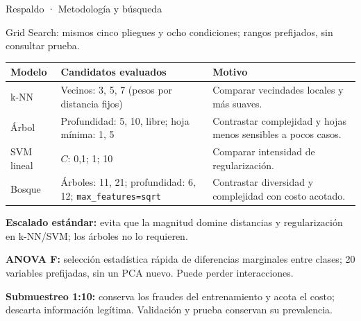\documentclass[aspectratio=169,10pt]{beamer}
\begin{document}
\begin{frame}{Respaldo · Metodología y búsqueda}
  \raggedright
  {\small\color{FraudGray}Grid Search: mismos cinco pliegues y ocho condiciones; rangos prefijados, sin consultar prueba.}\par
  \vspace{0.2cm}
  {\scriptsize
  \begin{tabularx}{\textwidth}{>{\raggedright\arraybackslash}p{1.6cm} >{\raggedright\arraybackslash}p{4.8cm} X}
    \toprule
    \rowcolor{FraudPaleBlue}\textbf{Modelo} & \textbf{Candidatos evaluados} & \textbf{Motivo} \\
    \midrule
    k-NN & Vecinos: 3, 5, 7 (pesos por distancia fijos) & Comparar vecindades locales y más suaves. \\
    \rowcolor{FraudLightGray}
    Árbol & Profundidad: 5, 10, libre; hoja mínima: 1, 5 & Contrastar complejidad y hojas menos sensibles a pocos casos. \\
    SVM lineal & $C$: 0,1; 1; 10 & Comparar intensidad de regularización. \\
    \rowcolor{FraudLightGray}
    Bosque & Árboles: 11, 21; profundidad: 6, 12; \texttt{max\_features=sqrt} & Contrastar diversidad y complejidad con costo acotado. \\
    \bottomrule
  \end{tabularx}}
  \vspace{0.2cm}
  {\small\textbf{Escalado estándar:} evita que la magnitud domine distancias y regularización en k-NN/SVM; los árboles no lo requieren.}\par
  \vspace{0.12cm}
  {\small\textbf{ANOVA F:} selección estadística rápida de diferencias marginales entre clases; 20 variables prefijadas, sin un PCA nuevo. Puede perder interacciones.}\par
  \vspace{0.12cm}
  {\small\textbf{Submuestreo 1:10:} conserva los fraudes del entrenamiento y acota el costo; descarta información legítima. Validación y prueba conservan su prevalencia.}\par
\end{frame}
\end{document}
